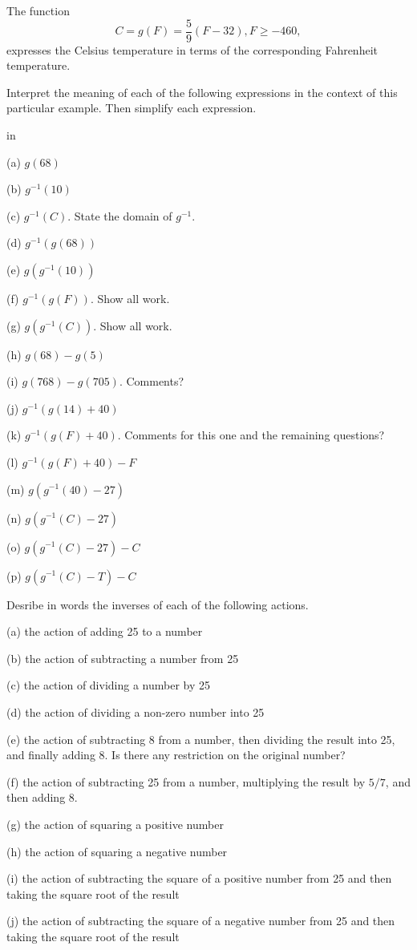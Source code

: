 \documentclass{ximera}
\newcommand{\pskip}{\vskip 0.1 in}
\begin{document}
\begin{example} \label{Ex1:Inverses}
The function
\[
    C = g(F) = \frac{5}{9}\left( F - 32  \right) , F\geq -460 ,
\]
expresses the Celsius temperature in terms of the corresponding Fahrenheit temperature.

Interpret the meaning of each of the following expressions in the context of this particular example. Then simplify each expression.

\pskip

(a) $g(68)$

(b) $g^{-1}(10)$

(c) $g^{-1}(C)$. State the domain of $g^{-1}$.

(d)  $g^{-1}(g(68))$

(e) $g(g^{-1}(10))$

(f) $g^{-1}(g(F))$. Show all work.

(g) $g(g^{-1}(C))$. Show all work.

(h) $g(68) - g(5)$

(i) $g(768) - g(705)$. Comments?

(j) $g^{-1}(g(14)+40)$

(k) $g^{-1}(g(F)+40)$. Comments for this one and the remaining questions?

(l) $g^{-1}(g(F)+40) - F$

(m) $g(g^{-1}(40) - 27)$

(n) $g(g^{-1}(C) - 27)$

(o) $g(g^{-1}(C) - 27) - C$

(p) $g(g^{-1}(C) - T) - C$

\end{example}



\begin{example}  \label{Ex2:Inverse}
Desribe in words the inverses of each of the following actions.

(a) the action of adding 25 to a number

(b) the action of subtracting a number from 25

(c) the action of dividing a number by 25

(d) the action of dividing a non-zero number into 25

(e) the action of subtracting 8 from a number, then dividing the result into 25, and finally adding 8. Is there any restriction on the original number?

(f) the action of subtracting 25 from a number, multiplying the result by $5/7$, and then adding 8.

(g) the action of squaring a positive number

(h) the action of squaring a negative number

(i) the action of subtracting the square of a positive number from 25 and then taking the square root of the result

(j) the action of subtracting the square of a negative number from 25 and then taking the square root of the result
\end{example}
\end{document}

